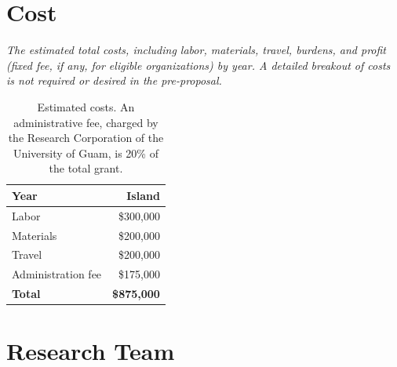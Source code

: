 \documentclass[11pt,english,letterpaper]{scrartcl}
\begin{document}
{
}

\clearpage
\section{Cost}

\textit{The estimated total costs, including labor, materials, travel, burdens, and profit	(fixed fee, if any, for eligible organizations) by year. A detailed breakout of costs is not	required or desired in the pre-proposal.}\\

\begin{table}[H]
	\centering
	\caption{Estimated costs. An administrative fee, charged by the Research Corporation of the University of Guam, is 20\% of the total grant.}	
	
	\begin{tabular}{lr}
		\toprule
		\textbf{Year} & \textbf{Island} \\ \midrule
		Labor & \$300,000 \\			
		Materials & \$200,000 \\
		Travel & \$200,000 \\
		Administration fee & \$175,000 \\	\midrule
		\textbf{Total} & \textbf{\$875,000}
	\end{tabular}
	\label{tbl:costs}	
\end{table}

\section{Research Team}
\end{document}
